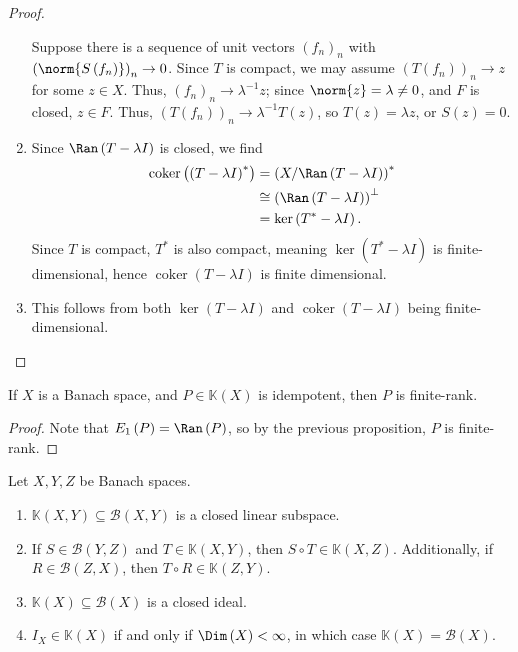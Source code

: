 \documentclass[10pt]{mypackage}
\begin{document}
\begin{proof}
\begin{enumerate}[(1)]
      Suppose there is a sequence of unit vectors $\left(f_n\right)_n$ with $\left(\norm{S\left(f_n\right)}\right)_{n}\rightarrow 0$. Since $T$ is compact, we may assume $\left(T\left(f_n\right)\right)_{n}\rightarrow z$ for some $z\in X$. Thus, $\left(f_n\right)_{n}\rightarrow \lambda^{-1}z$; since $\norm{z} = \lambda \neq 0$, and $F$ is closed, $z\in F$. Thus, $\left(T\left(f_n\right)\right)_{n}\rightarrow \lambda^{-1}T\left(z\right)$, so $T\left(z\right) = \lambda z$, or $S\left(z\right) = 0$.
    \item Since $\Ran\left(T-\lambda I\right)$ is closed, we find
      \begin{align*}
        \operatorname{coker}\left(\left(T-\lambda I\right)^{\ast}\right) &= \left(X/\Ran\left(T-\lambda I\right)\right)^{\ast}\\
                                                                         &\cong \left(\Ran\left(T-\lambda I\right)\right)^{\perp}\\
                                                                         &= \ker\left(T^{\ast}-\lambda I\right).
      \end{align*}
      Since $T$ is compact, $T^{\ast}$ is also compact, meaning $\ker\left(T^{\ast}-\lambda I\right)$ is finite-dimensional, hence $\operatorname{coker}\left(T-\lambda I\right)$ is finite dimensional.
    \item This follows from both $\ker\left(T-\lambda I\right)$ and $\operatorname{coker}\left(T-\lambda I\right)$ being finite-dimensional.
  \end{enumerate}
\end{proof}
\begin{corollary}
  If $X$ is a Banach space, and $P\in \mathds{K}(X)$ is idempotent, then $P$ is finite-rank.
\end{corollary}
\begin{proof}
  Note that $E_{1}\left(P\right) = \Ran\left(P\right)$, so by the previous proposition, $P$ is finite-rank.
\end{proof}
\begin{theorem}
  Let $X,Y,Z$ be Banach spaces.
  \begin{enumerate}[(1)]
    \item $\mathds{K}\left(X,Y\right)\subseteq \mathcal{B}\left(X,Y\right)$ is a closed linear subspace.
    \item If $S\in \mathcal{B}\left(Y,Z\right)$ and $T\in \mathds{K}\left(X,Y\right)$, then $S\circ T\in \mathds{K}\left(X,Z\right)$. Additionally, if $R\in \mathcal{B}\left(Z,X\right)$, then $T\circ R\in \mathds{K}\left(Z,Y\right)$.
    \item $\mathds{K}\left(X\right)\subseteq \mathcal{B}\left(X\right)$ is a closed ideal.
    \item $I_{X}\in \mathds{K}\left(X\right)$ if and only if $\Dim\left(X\right) < \infty$, in which case $\mathds{K}\left(X\right) = \mathcal{B}\left(X\right)$.
  \end{enumerate}
\end{theorem}
\end{document}
